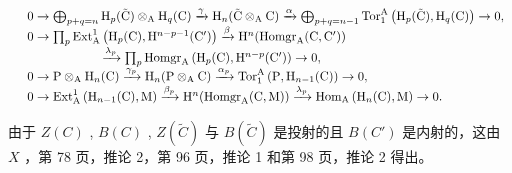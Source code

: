 \[
\begin{array}{r l} & 0 \to \bigoplus_ {p + q = n} \mathrm{H} _ {p} (\tilde {\mathrm{C}}) \otimes_ {\mathrm{A}} \mathrm{H} _ {q} (\mathrm{C}) \xrightarrow {\gamma} \mathrm{H} _ {n} (\tilde {\mathrm{C}} \otimes_ {\mathrm{A}} \mathrm{C}) \xrightarrow {\alpha} \bigoplus_ {p + q = n - 1} \mathrm{Tor} _ {1} ^ {\mathrm{A}} \left(\mathrm{H} _ {p} (\tilde {\mathrm{C}}), \mathrm{H} _ {q} (\mathrm{C})\right) \to 0, \\ & 0 \to \prod_ {p} \mathrm{Ext} _ {\mathrm{A}} ^ {1} \left(\mathrm{H} _ {p} (\mathrm{C}), \mathrm{H} ^ {n - p - 1} (\mathrm{C} ^ {\prime})\right) \xrightarrow {\beta} \mathrm{H} ^ {n} (\mathrm{Homgr} _ {\mathrm{A}} (\mathrm{C}, \mathrm{C} ^ {\prime})) \\ & \qquad \qquad \qquad \xrightarrow {\lambda_ {p}} \prod_ {p} \mathrm{Homgr} _ {\mathrm{A}} \left(\mathrm{H} _ {p} (\mathrm{C}), \mathrm{H} ^ {n - p} (\mathrm{C} ^ {\prime})\right) \to 0, \\ & 0 \to \mathrm{P} \otimes_ {\mathrm{A}} \mathrm{H} _ {n} (\mathrm{C}) \xrightarrow {\gamma_ {p}} \mathrm{H} _ {n} (\mathrm{P} \otimes_ {\mathrm{A}} \mathrm{C}) \xrightarrow {\alpha_ {p}} \mathrm{Tor} _ {1} ^ {\mathrm{A}} \left(\mathrm{P}, \mathrm{H} _ {n - 1} (\mathrm{C})\right) \to 0, \\ & 0 \to \mathrm{Ext} _ {\mathrm{A}} ^ {1} \left(\mathrm{H} _ {n - 1} (\mathrm{C}), \mathrm{M}\right) \xrightarrow {\beta_ {p}} \mathrm{H} ^ {n} (\mathrm{Homgr} _ {\mathrm{A}} (\mathrm{C}, \mathrm{M})) \xrightarrow {\lambda_ {p}} \mathrm{Hom} _ {\mathrm{A}} \left(\mathrm{H} _ {n} (\mathrm{C}), \mathrm{M}\right) \to 0. \end{array}
\]

由于 \(Z(C)\) , \(B(C)\) , \(Z(\tilde{C})\) 与 \(B(\tilde{C})\) 是投射的且 \(B(C')\) 是内射的，这由 \(X\) ，第 78 页，推论 2，第 96 页，推论 1 和第 98 页，推论 2 得出。

